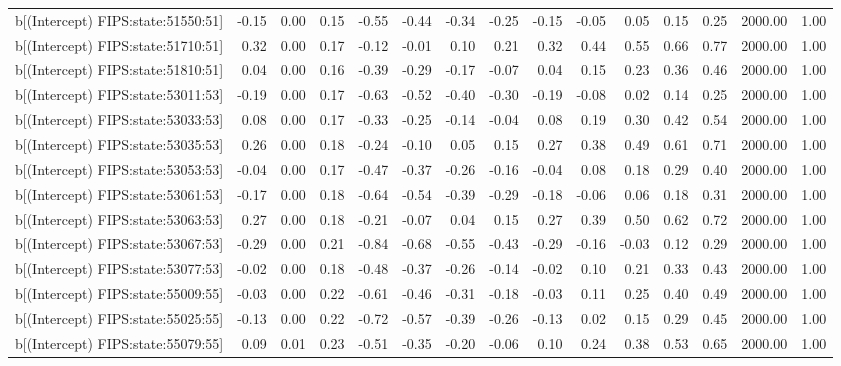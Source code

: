 \begin{table}[ht]
\begin{tabular}{rrrrrrrrrrrrrrr}
  b[(Intercept) FIPS:state:51550:51] & -0.15 & 0.00 & 0.15 & -0.55 & -0.44 & -0.34 & -0.25 & -0.15 & -0.05 & 0.05 & 0.15 & 0.25 & 2000.00 & 1.00 \\ 
  b[(Intercept) FIPS:state:51710:51] & 0.32 & 0.00 & 0.17 & -0.12 & -0.01 & 0.10 & 0.21 & 0.32 & 0.44 & 0.55 & 0.66 & 0.77 & 2000.00 & 1.00 \\ 
  b[(Intercept) FIPS:state:51810:51] & 0.04 & 0.00 & 0.16 & -0.39 & -0.29 & -0.17 & -0.07 & 0.04 & 0.15 & 0.23 & 0.36 & 0.46 & 2000.00 & 1.00 \\ 
  b[(Intercept) FIPS:state:53011:53] & -0.19 & 0.00 & 0.17 & -0.63 & -0.52 & -0.40 & -0.30 & -0.19 & -0.08 & 0.02 & 0.14 & 0.25 & 2000.00 & 1.00 \\ 
  b[(Intercept) FIPS:state:53033:53] & 0.08 & 0.00 & 0.17 & -0.33 & -0.25 & -0.14 & -0.04 & 0.08 & 0.19 & 0.30 & 0.42 & 0.54 & 2000.00 & 1.00 \\ 
  b[(Intercept) FIPS:state:53035:53] & 0.26 & 0.00 & 0.18 & -0.24 & -0.10 & 0.05 & 0.15 & 0.27 & 0.38 & 0.49 & 0.61 & 0.71 & 2000.00 & 1.00 \\ 
  b[(Intercept) FIPS:state:53053:53] & -0.04 & 0.00 & 0.17 & -0.47 & -0.37 & -0.26 & -0.16 & -0.04 & 0.08 & 0.18 & 0.29 & 0.40 & 2000.00 & 1.00 \\ 
  b[(Intercept) FIPS:state:53061:53] & -0.17 & 0.00 & 0.18 & -0.64 & -0.54 & -0.39 & -0.29 & -0.18 & -0.06 & 0.06 & 0.18 & 0.31 & 2000.00 & 1.00 \\ 
  b[(Intercept) FIPS:state:53063:53] & 0.27 & 0.00 & 0.18 & -0.21 & -0.07 & 0.04 & 0.15 & 0.27 & 0.39 & 0.50 & 0.62 & 0.72 & 2000.00 & 1.00 \\ 
  b[(Intercept) FIPS:state:53067:53] & -0.29 & 0.00 & 0.21 & -0.84 & -0.68 & -0.55 & -0.43 & -0.29 & -0.16 & -0.03 & 0.12 & 0.29 & 2000.00 & 1.00 \\ 
  b[(Intercept) FIPS:state:53077:53] & -0.02 & 0.00 & 0.18 & -0.48 & -0.37 & -0.26 & -0.14 & -0.02 & 0.10 & 0.21 & 0.33 & 0.43 & 2000.00 & 1.00 \\ 
  b[(Intercept) FIPS:state:55009:55] & -0.03 & 0.00 & 0.22 & -0.61 & -0.46 & -0.31 & -0.18 & -0.03 & 0.11 & 0.25 & 0.40 & 0.49 & 2000.00 & 1.00 \\ 
  b[(Intercept) FIPS:state:55025:55] & -0.13 & 0.00 & 0.22 & -0.72 & -0.57 & -0.39 & -0.26 & -0.13 & 0.02 & 0.15 & 0.29 & 0.45 & 2000.00 & 1.00 \\ 
  b[(Intercept) FIPS:state:55079:55] & 0.09 & 0.01 & 0.23 & -0.51 & -0.35 & -0.20 & -0.06 & 0.10 & 0.24 & 0.38 & 0.53 & 0.65 & 2000.00 & 1.00 \\ 

\end{tabular}
\end{table}
